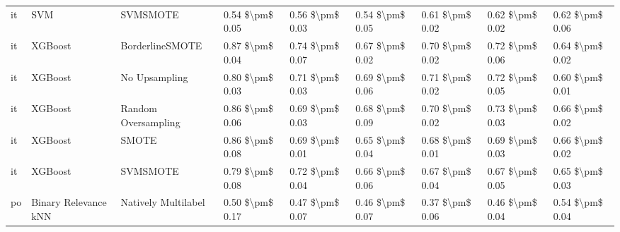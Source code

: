 \begin{tabular}{lllllllll}
      it &                             SVM &                      SVMSMOTE &     0.54 \$\textbackslash pm\$ 0.05 &           0.56 \$\textbackslash pm\$ 0.03 &       0.54 \$\textbackslash pm\$ 0.05 &        0.61 \$\textbackslash pm\$ 0.02 &                         0.62 \$\textbackslash pm\$ 0.02 &     0.62 \$\textbackslash pm\$ 0.06 \\
      it &                         XGBoost &               BorderlineSMOTE &     0.87 \$\textbackslash pm\$ 0.04 &           0.74 \$\textbackslash pm\$ 0.07 &       0.67 \$\textbackslash pm\$ 0.02 &        0.70 \$\textbackslash pm\$ 0.02 &                         0.72 \$\textbackslash pm\$ 0.06 &     0.64 \$\textbackslash pm\$ 0.02 \\
      it &                         XGBoost &                 No Upsampling &     0.80 \$\textbackslash pm\$ 0.03 &           0.71 \$\textbackslash pm\$ 0.03 &       0.69 \$\textbackslash pm\$ 0.06 &        0.71 \$\textbackslash pm\$ 0.02 &                         0.72 \$\textbackslash pm\$ 0.05 &     0.60 \$\textbackslash pm\$ 0.01 \\
      it &                         XGBoost &           Random Oversampling &     0.86 \$\textbackslash pm\$ 0.06 &           0.69 \$\textbackslash pm\$ 0.03 &       0.68 \$\textbackslash pm\$ 0.09 &        0.70 \$\textbackslash pm\$ 0.02 &                         0.73 \$\textbackslash pm\$ 0.03 &     0.66 \$\textbackslash pm\$ 0.02 \\
      it &                         XGBoost &                         SMOTE &     0.86 \$\textbackslash pm\$ 0.08 &           0.69 \$\textbackslash pm\$ 0.01 &       0.65 \$\textbackslash pm\$ 0.04 &        0.68 \$\textbackslash pm\$ 0.01 &                         0.69 \$\textbackslash pm\$ 0.03 &     0.66 \$\textbackslash pm\$ 0.02 \\
      it &                         XGBoost &                      SVMSMOTE &     0.79 \$\textbackslash pm\$ 0.08 &           0.72 \$\textbackslash pm\$ 0.04 &       0.66 \$\textbackslash pm\$ 0.06 &        0.67 \$\textbackslash pm\$ 0.04 &                         0.67 \$\textbackslash pm\$ 0.05 &     0.65 \$\textbackslash pm\$ 0.03 \\
      po &            Binary Relevance kNN &           Natively Multilabel &     0.50 \$\textbackslash pm\$ 0.17 &           0.47 \$\textbackslash pm\$ 0.07 &       0.46 \$\textbackslash pm\$ 0.07 &        0.37 \$\textbackslash pm\$ 0.06 &                         0.46 \$\textbackslash pm\$ 0.04 &     0.54 \$\textbackslash pm\$ 0.04 \\

\end{tabular}
